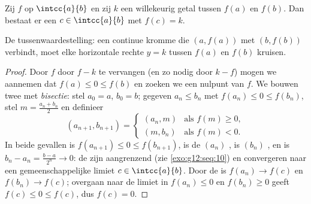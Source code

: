 \begin{theorem}[Tussenwaardestelling]\label{thm:g12:limcont:ivt}
Zij $f$  op $\intcc{a}{b}$ en zij $k$ een willekeurig getal tussen
$f(a)$ en $f(b)$. Dan bestaat er een $c \in \intcc{a}{b}$ met $f(c) = k$.
\end{theorem}

\begin{omfigure}

{\small De tussenwaardestelling: een continue kromme die $(a, f(a))$ met
$(b, f(b))$ verbindt, moet elke horizontale rechte $y = k$ tussen $f(a)$ en
$f(b)$ kruisen.}
\end{omfigure}

\begin{proof}
Door $f$ door $f - k$ te vervangen (en zo nodig door $k - f$) mogen we
aannemen dat $f(a) \leq 0 \leq f(b)$ en zoeken we een nulpunt van $f$. We
bouwen twee  met \emph{bisectie}: stel $a_0 = a$,
$b_0 = b$; gegeven $a_n \leq b_n$ met $f(a_n) \leq 0 \leq f(b_n)$, stel
$m = \frac{a_n + b_n}{2}$ en definieer
\[
(a_{n+1}, b_{n+1}) =
\begin{cases}
(a_n, m) & \text{als } f(m) \geq 0,\\
(m, b_n) & \text{als } f(m) < 0.
\end{cases}
\]
In beide gevallen is $f(a_{n+1}) \leq 0 \leq f(b_{n+1})$, is de  $(a_n)$
, is $(b_n)$ , en is $b_n - a_n = \frac{b-a}{2^n} \to 0$: de
 zijn aangrenzend (zie \cref{exo:g12:seq:10}) en convergeren naar een
gemeenschappelijke limiet $c \in \intcc{a}{b}$. Door de  is
$f(a_n) \to f(c)$ en $f(b_n) \to f(c)$; overgaan naar de limiet in
$f(a_n) \leq 0$ en $f(b_n) \geq 0$ geeft $f(c) \leq 0 \leq f(c)$, dus
$f(c) = 0$.
\end{proof}

